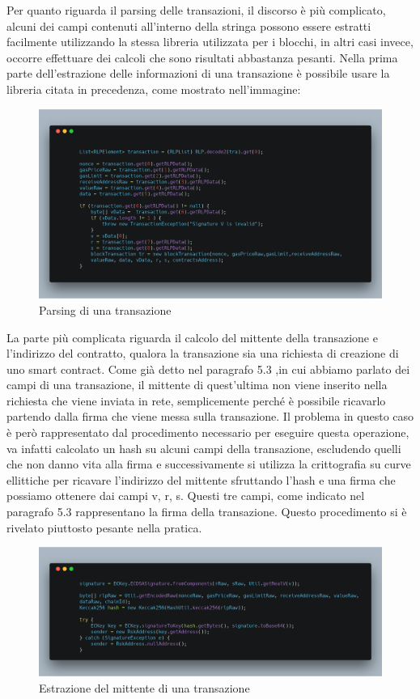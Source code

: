 \documentclass[12pt]{report}
\begin{document}
Per quanto riguarda il parsing delle transazioni, il discorso è più complicato, alcuni dei campi contenuti all'interno della stringa possono essere estratti facilmente utilizzando la stessa libreria utilizzata per i blocchi, in altri casi invece, occorre effettuare dei calcoli che sono risultati abbastanza pesanti.\newline
Nella prima parte dell'estrazione delle informazioni di una transazione è possibile usare la libreria citata in precedenza, come mostrato nell'immagine:
\begin{figure}[H]
    \includegraphics[width=\textwidth]{carbon-15}
    \caption{Parsing di una transazione}
\end{figure}
La parte più complicata riguarda il calcolo del mittente della transazione e l'indirizzo del contratto, qualora la transazione sia una richiesta di creazione di uno smart contract.
Come già detto nel paragrafo 5.3 ,in cui abbiamo parlato dei campi di una transazione, il mittente di quest'ultima non viene inserito nella richiesta che viene inviata in rete, semplicemente perché è possibile ricavarlo partendo dalla firma che viene messa sulla transazione.
Il problema in questo caso è però rappresentato dal procedimento necessario per eseguire questa operazione, va infatti calcolato un hash su alcuni campi della transazione, escludendo quelli che non danno vita alla firma e successivamente si utilizza la crittografia su curve ellittiche per ricavare l'indirizzo del mittente sfruttando l'hash e una firma che possiamo ottenere dai campi v, r, s. Questi tre campi, come indicato nel paragrafo 5.3 rappresentano la firma della transazione. 
Questo procedimento si è rivelato piuttosto pesante nella pratica.

\begin{figure}[H]
    \includegraphics[width=\textwidth]{carbon-16}
    \caption{Estrazione del mittente di una transazione}
\end{figure}
\end{document}
